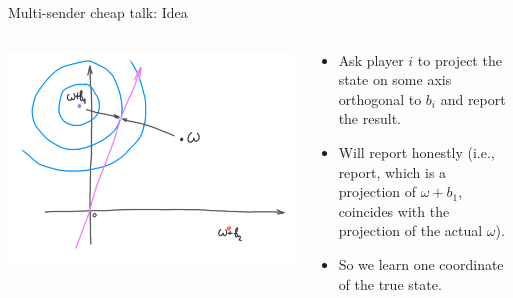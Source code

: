 \documentclass[english,10pt
,aspectratio=169
]{beamer}
\begin{document}
\begin{frame}{Multi-sender cheap talk: Idea}
	\begin{columns}
		\begin{column}{0.5\textwidth}
			\begin{center}
				\includegraphics[scale=0.65]{pics/M4/battaglini02.png}
			\end{center}
		\end{column}
		\begin{column}{0.5\textwidth}
			{\small
				\begin{itemize}
					\item Ask player $i$ to project the state on some axis orthogonal to $b_i$ and report the result.
					\item Will report honestly (i.e., report, which is a projection of $\omega +b_1$, coincides with the projection of the actual $\omega$).
					\item So we learn one coordinate of the true state.
				\end{itemize}
			}
		\end{column}
	\end{columns}
\end{frame}
\end{document}
